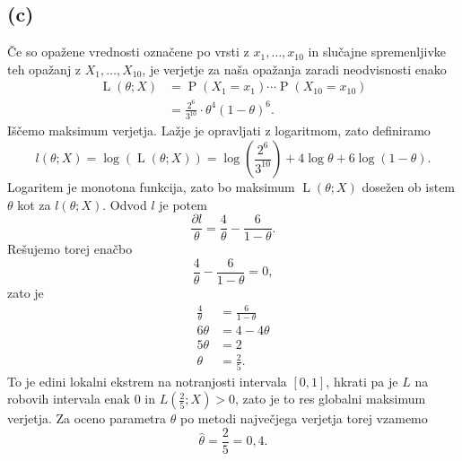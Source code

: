 \documentclass{article}
\DeclareMathOperator{\verjetje}{L}
\DeclareMathOperator{\verjetnost}{P}
\begin{document}
\subsection*{(c)}
Če so opažene vrednosti označene po vrsti z $x_1, \ldots, x_{10}$ in slučajne spremenljivke teh opažanj z $X_1, \ldots, X_{10}$, je verjetje za naša opažanja zaradi neodvisnosti enako
\begin{align*}
    \verjetje(\theta; X) &= \verjetnost(X_1 = x_1) \cdots \verjetnost(X_{10} = x_{10}) \\
    &= \frac{2^6}{3^{10}}\cdot \theta^4 (1- \theta)^6.
\end{align*}
Iščemo maksimum verjetja. Lažje je opravljati z logaritmom, zato definiramo
\begin{equation*}
    l(\theta; X) = \log(\verjetje(\theta; X)) =  \log \left(\frac{2^6}{3^{10}} \right) + 4\log \theta + 6\log(1- \theta).
\end{equation*}
Logaritem je monotona funkcija, zato bo maksimum $\verjetje(\theta; X)$ dosežen ob istem $\theta$ kot za $l(\theta; X)$. Odvod $l$ je potem
\begin{equation*}
    \frac{\partial l}{\theta} = \frac{4}{\theta} - \frac{6}{1 - \theta}.
\end{equation*}
Rešujemo torej enačbo
\begin{equation*}
    \frac{4}{\theta} - \frac{6}{1 - \theta} = 0,
\end{equation*}
zato je
\begin{align*}
    \frac{4}{\theta} &= \frac{6}{1-\theta} \\
    6 \theta &= 4 - 4 \theta \\
    5 \theta &= 2 \\
    \theta &= \frac{2}{5}.
\end{align*}
To je edini lokalni ekstrem na notranjosti intervala $[0, 1]$, hkrati pa je $L$ na robovih intervala enak $0$ in $L(\frac{2}{5}; X) > 0$, zato je to res globalni maksimum verjetja. Za oceno parametra $\theta$ po metodi največjega verjetja torej vzamemo
\begin{equation*}
    \widehat{\theta} = \frac{2}{5} = 0{,}4.
\end{equation*}
\end{document}
